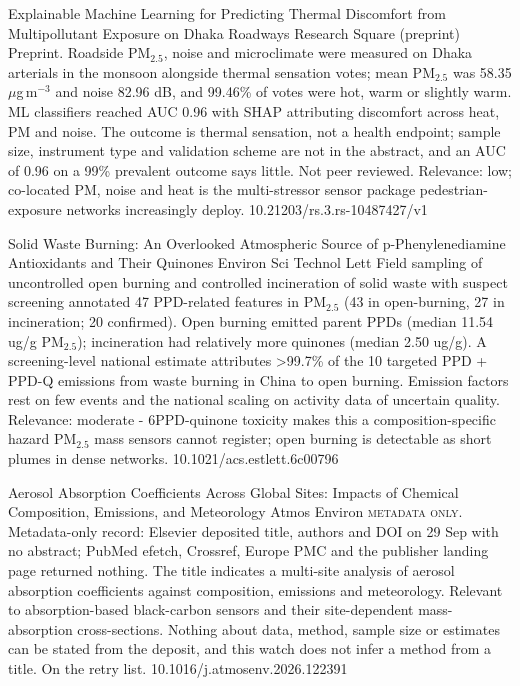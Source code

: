 \documentclass[10pt]{article}
\begin{document}
{Explainable Machine Learning for Predicting Thermal Discomfort from Multipollutant Exposure on Dhaka Roadways}
{Research Square (preprint)}
{Preprint. Roadside PM$_{2.5}$, noise and microclimate were measured on Dhaka arterials in the monsoon alongside thermal sensation votes; mean PM$_{2.5}$ was 58.35 $\mu$g\,m$^{-3}$ and noise 82.96 dB, and 99.46\% of votes were hot, warm or slightly warm. ML classifiers reached AUC 0.96 with SHAP attributing discomfort across heat, PM and noise. The outcome is thermal sensation, not a health endpoint; sample size, instrument type and validation scheme are not in the abstract, and an AUC of 0.96 on a 99\% prevalent outcome says little. Not peer reviewed. Relevance: low; co-located PM, noise and heat is the multi-stressor sensor package pedestrian-exposure networks increasingly deploy.}
{10.21203/rs.3.rs-10487427/v1}

{Solid Waste Burning: An Overlooked Atmospheric Source of p-Phenylenediamine Antioxidants and Their Quinones}
{Environ Sci Technol Lett}
{Field sampling of uncontrolled open burning and controlled incineration of solid waste with suspect screening annotated 47 PPD-related features in PM$_{2.5}$ (43 in open-burning, 27 in incineration; 20 confirmed). Open burning emitted parent PPDs (median 11.54 ug/g PM$_{2.5}$); incineration had relatively more quinones (median 2.50 ug/g). A screening-level national estimate attributes >99.7\% of the 10 targeted PPD + PPD-Q emissions from waste burning in China to open burning. Emission factors rest on few events and the national scaling on activity data of uncertain quality. Relevance: moderate - 6PPD-quinone toxicity makes this a composition-specific hazard PM$_{2.5}$ mass sensors cannot register; open burning is detectable as short plumes in dense networks.}
{10.1021/acs.estlett.6c00796}

{Aerosol Absorption Coefficients Across Global Sites: Impacts of Chemical Composition, Emissions, and Meteorology}
{Atmos Environ}
{\textsc{metadata only.} Metadata-only record: Elsevier deposited title, authors and DOI on 29 Sep with no abstract; PubMed efetch, Crossref, Europe PMC and the publisher landing page returned nothing. The title indicates a multi-site analysis of aerosol absorption coefficients against composition, emissions and meteorology. Relevant to absorption-based black-carbon sensors and their site-dependent mass-absorption cross-sections. Nothing about data, method, sample size or estimates can be stated from the deposit, and this watch does not infer a method from a title. On the retry list.}
{10.1016/j.atmosenv.2026.122391}
\end{document}
